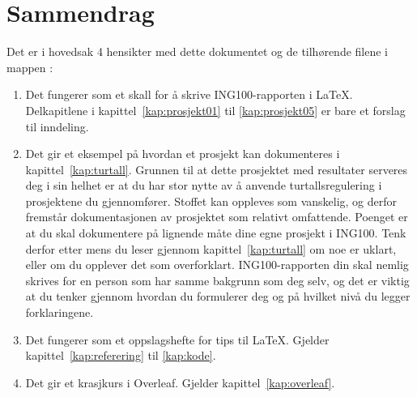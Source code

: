 
\chapter*{Sammendrag}  
Det er i hovedsak 4 hensikter med dette dokumentet og de tilhørende filene
i mappen :

\begin{enumerate}
\item Det fungerer som et
skall for å skrive ING100-rapporten  i {\LaTeX}. 
Delkapitlene i kapittel~\ref{kap:prosjekt01} til
\ref{kap:prosjekt05} er bare et forslag til inndeling.

\item Det gir et  eksempel på hvordan et prosjekt
kan dokumenteres i kapittel~\ref{kap:turtall}.
Grunnen til at dette prosjektet med resultater serveres deg i sin
helhet er at du har stor nytte av å anvende turtallsregulering i
prosjektene du gjennomfører. Stoffet kan oppleves som vanskelig, og 
derfor fremstår dokumentasjonen av prosjektet som relativt
omfattende. Poenget er at du skal dokumentere på lignende måte dine
egne prosjekt i ING100. Tenk derfor etter mens du leser gjennom
kapittel~\ref{kap:turtall} om noe er uklart, eller om du opplever det
som overforklart. ING100-rapporten din skal nemlig
skrives for en person som har samme bakgrunn som deg selv, og
det er viktig at du tenker gjennom hvordan du formulerer deg og på
hvilket nivå du legger forklaringene. 

\item Det fungerer som et oppslagshefte for tips til
{\LaTeX}. Gjelder kapittel~\ref{kap:referering} til \ref{kap:kode}.

\item Det gir et krasjkurs i Overleaf. Gjelder kapittel~\ref{kap:overleaf}.


\end{enumerate}
